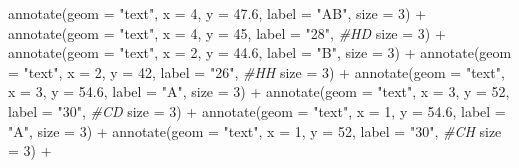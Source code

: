 \documentclass[
]{article}
\newenvironment{Shaded}{\begin{snugshade}}{\end{snugshade}}
\newcommand{\AttributeTok}[1]{\textcolor[rgb]{0.77,0.63,0.00}{#1}}
\newcommand{\CommentTok}[1]{\textcolor[rgb]{0.56,0.35,0.01}{\textit{#1}}}
\newcommand{\DecValTok}[1]{\textcolor[rgb]{0.00,0.00,0.81}{#1}}
\newcommand{\FloatTok}[1]{\textcolor[rgb]{0.00,0.00,0.81}{#1}}
\newcommand{\FunctionTok}[1]{\textcolor[rgb]{0.00,0.00,0.00}{#1}}
\newcommand{\NormalTok}[1]{#1}
\newcommand{\SpecialCharTok}[1]{\textcolor[rgb]{0.00,0.00,0.00}{#1}}
\newcommand{\StringTok}[1]{\textcolor[rgb]{0.31,0.60,0.02}{#1}}
\begin{document}
\begin{Shaded}
\begin{Highlighting}[]
  \FunctionTok{annotate}\NormalTok{(}\AttributeTok{geom =} \StringTok{"text"}\NormalTok{, }\AttributeTok{x =} \DecValTok{4}\NormalTok{, }\AttributeTok{y =} \FloatTok{47.6}\NormalTok{, }\AttributeTok{label =} \StringTok{"AB"}\NormalTok{, }
           \AttributeTok{size =} \DecValTok{3}\NormalTok{) }\SpecialCharTok{+}
  \FunctionTok{annotate}\NormalTok{(}\AttributeTok{geom =} \StringTok{"text"}\NormalTok{, }\AttributeTok{x =} \DecValTok{4}\NormalTok{, }\AttributeTok{y =} \DecValTok{45}\NormalTok{, }\AttributeTok{label =} \StringTok{"28"}\NormalTok{, }\CommentTok{\#HD}
           \AttributeTok{size =} \DecValTok{3}\NormalTok{) }\SpecialCharTok{+}
  \FunctionTok{annotate}\NormalTok{(}\AttributeTok{geom =} \StringTok{"text"}\NormalTok{, }\AttributeTok{x =} \DecValTok{2}\NormalTok{, }\AttributeTok{y =} \FloatTok{44.6}\NormalTok{, }\AttributeTok{label =} \StringTok{"B"}\NormalTok{, }
           \AttributeTok{size =} \DecValTok{3}\NormalTok{) }\SpecialCharTok{+}
  \FunctionTok{annotate}\NormalTok{(}\AttributeTok{geom =} \StringTok{"text"}\NormalTok{, }\AttributeTok{x =} \DecValTok{2}\NormalTok{, }\AttributeTok{y =} \DecValTok{42}\NormalTok{, }\AttributeTok{label =} \StringTok{"26"}\NormalTok{, }\CommentTok{\#HH}
           \AttributeTok{size =} \DecValTok{3}\NormalTok{) }\SpecialCharTok{+}
  \FunctionTok{annotate}\NormalTok{(}\AttributeTok{geom =} \StringTok{"text"}\NormalTok{, }\AttributeTok{x =} \DecValTok{3}\NormalTok{, }\AttributeTok{y =} \FloatTok{54.6}\NormalTok{, }\AttributeTok{label =} \StringTok{"A"}\NormalTok{, }
           \AttributeTok{size =} \DecValTok{3}\NormalTok{) }\SpecialCharTok{+}
  \FunctionTok{annotate}\NormalTok{(}\AttributeTok{geom =} \StringTok{"text"}\NormalTok{, }\AttributeTok{x =} \DecValTok{3}\NormalTok{, }\AttributeTok{y =} \DecValTok{52}\NormalTok{, }\AttributeTok{label =} \StringTok{"30"}\NormalTok{, }\CommentTok{\#CD}
           \AttributeTok{size =} \DecValTok{3}\NormalTok{) }\SpecialCharTok{+}
  \FunctionTok{annotate}\NormalTok{(}\AttributeTok{geom =} \StringTok{"text"}\NormalTok{, }\AttributeTok{x =} \DecValTok{1}\NormalTok{, }\AttributeTok{y =} \FloatTok{54.6}\NormalTok{, }\AttributeTok{label =} \StringTok{"A"}\NormalTok{, }
           \AttributeTok{size =} \DecValTok{3}\NormalTok{) }\SpecialCharTok{+}
  \FunctionTok{annotate}\NormalTok{(}\AttributeTok{geom =} \StringTok{"text"}\NormalTok{, }\AttributeTok{x =} \DecValTok{1}\NormalTok{, }\AttributeTok{y =} \DecValTok{52}\NormalTok{, }\AttributeTok{label =} \StringTok{"30"}\NormalTok{, }\CommentTok{\#CH}
           \AttributeTok{size =} \DecValTok{3}\NormalTok{) }\SpecialCharTok{+}
  

\end{Highlighting}
\end{Shaded}
\end{document}

